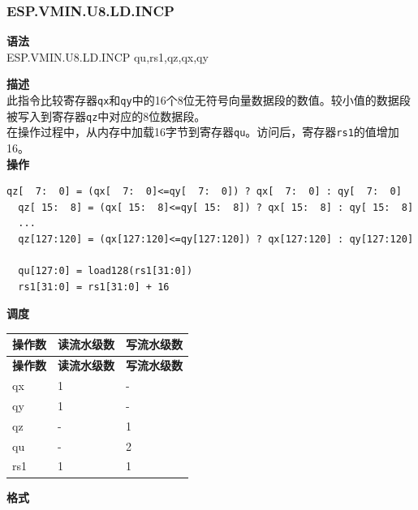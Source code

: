 \newpage
\subsubsection{ESP.VMIN.U8.LD.INCP}\label{instruction:ESPVMINU8LDINCP}
\textbf{语法}\\
ESP.VMIN.U8.LD.INCP qu,rs1,qz,qx,qy

\textbf{描述}\\
此指令比较寄存器\lstinline{qx}和\lstinline{qy}中的16个8位无符号向量数据段的数值。较小值的数据段被写入到寄存器\lstinline{qz}中对应的8位数据段。\\在操作过程中，从内存中加载16字节到寄存器\lstinline{qu}。访问后，寄存器\lstinline{rs1}的值增加16。\\
\textbf{操作}
\begin{lstlisting}[escapeinside=`?]
  qz[  7:  0] = (qx[  7:  0]<=qy[  7:  0]) ? qx[  7:  0] : qy[  7:  0]
  qz[ 15:  8] = (qx[ 15:  8]<=qy[ 15:  8]) ? qx[ 15:  8] : qy[ 15:  8]
  ...
  qz[127:120] = (qx[127:120]<=qy[127:120]) ? qx[127:120] : qy[127:120]

  qu[127:0] = load128(rs1[31:0])
  rs1[31:0] = rs1[31:0] + 16
\end{lstlisting}


\textbf{调度}\\
\begin{longtable}[c]{|l|l|l|}
    \hline
    \rowcolor{lightgray}
    \textbf{操作数} & \textbf{读流水级数} & \textbf{写流水级数} \\\hline
    \endfirsthead
    \hline
    \rowcolor{lightgray}
     \textbf{操作数} & \textbf{读流水级数} & \textbf{写流水级数} \\\hline
    \endhead
    \hline
    \endfoot

    qx & 1 & - \\\hline
  qy & 1 & - \\\hline
     qz & - & 1 \\\hline
     qu & - & 2 \\\hline
     rs1 & 1 & 1

\end{longtable}

\textbf{格式}\\

